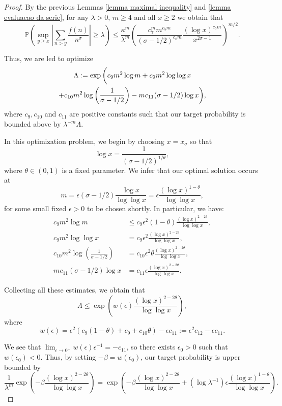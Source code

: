 \documentclass[10pt,a4paper]{amsart}
\newcommand{\PP}{\mathbb{P}}
\begin{document}
\begin{proof}
By the previous Lemmas \ref{lemma maximal inequality} and \ref{lemma evaluacao da serie}, for any $\lambda>0$, $m\geq 4$ and all $x\geq 2$ we obtain that
$$\PP\left(\sup_{y\geq x}\left|\sum_{n>y}\frac{f(n)}{n^\sigma}\right|\geq \lambda\right)\leq \frac{\kappa^{m}}{\lambda^m}\left(\frac{c_7^m m^{c_5m}}{(\sigma-1/2)^{c_8m}}\frac{(\log x)^{c_5m}}{x^{2\sigma-1}}\right)^{m/2}.$$

Thus, we are led to optimize
\begin{multline*}
\Lambda:=\exp\bigg{(}c_9m^2\log m+c_9m^{2}\log\log x\\
+c_{10}m^2\log\left(\frac{1}{\sigma-1/2}\right)-mc_{11}(\sigma-1/2)\log x\bigg),
\end{multline*}
where $c_9,c_{10}$ and $c_{11}$ are positive constants such that our target probability is bounded above by $\lambda^{-m}\Lambda$.

In this optimization problem, we begin by choosing $x=x_\sigma$ so that 
\begin{equation}\label{equation auxiliar definition of x} 
\log x = \frac{1}{(\sigma-1/2)^{1/\theta}}, 
\end{equation} 
where $\theta\in(0,1)$ is a fixed parameter. We infer that our optimal solution occurs at
$$m= \epsilon(\sigma-1/2)\frac{\log x}{\log\log x }=\epsilon\frac{(\log x)^{1-\theta}}{\log\log x},$$
for some small fixed $\epsilon>0$ to be chosen shortly.
In particular, we have:
\begin{align*}
c_9m^2\log m &\leq c_9\epsilon^2(1-\theta)\frac{(\log x)^{2-2\theta}}{\log\log x}, \\
c_9m^2\log\log x&=c_9\epsilon^2\frac{(\log x)^{2-2\theta}}{\log\log x},\\
c_{10}m^2\log\left(\frac{1}{\sigma-1/2}\right)&=c_{10}\epsilon^2\theta\frac{(\log x)^{2-2\theta}}{\log\log x},\\
mc_{11}(\sigma-1/2)\log x&=c_{11}\epsilon\frac{(\log x)^{2-2\theta}}{\log\log x}.
\end{align*}

Collecting all these estimates, we obtain that
$$\Lambda\leq \exp\left(w(\epsilon)\frac{(\log x)^{2-2\theta}}{\log\log x}\right),$$
where 
$$w(\epsilon)=\epsilon^2( c_9(1-\theta)+c_9+c_{10}\theta)-\epsilon c_{11}:=\epsilon^2c_{12}-\epsilon c_{11}.$$

We see that $\lim_{\epsilon\to 0^+} w(\epsilon)\epsilon^{-1}=-c_{11}$, so there exists $\epsilon_0>0$ such that
$w(\epsilon_0)<0$. Thus, by setting $-\beta=w(\epsilon_0)$, our target probability is upper bounded
by
$$\frac{1}{\lambda^m}\exp\left(-\beta \frac{(\log x)^{2-2\theta}}{\log\log x}\right)=\exp\left(-\beta \frac{(\log x)^{2-2\theta}}{\log\log x}+(\log\lambda ^{-1})\epsilon\frac{(\log x)^{1-\theta}}{\log\log x} \right).$$
\end{proof}
\end{document}
